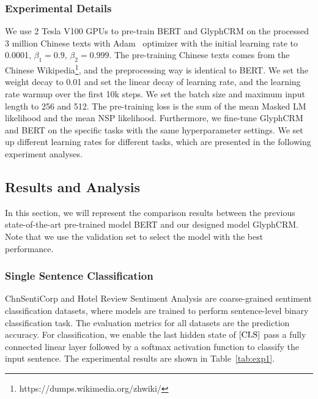 \subsubsection{Experimental Details} We use 2 Tesla V100 GPUs to pre-train BERT and GlyphCRM on the processed 3 million Chinese texts with Adam~\cite{kingma2014method} optimizer with the initial learning rate to 0.0001, $\beta_{1} = 0.9$, $\beta_{2} = 0.999$.
The pre-training Chinese texts comes from the Chinese Wikipedia\footnote{https://dumps.wikimedia.org/zhwiki/}, and the preprocessing way is identical to BERT.
We set the weight decay to 0.01 and set the linear decay of learning rate, and the learning rate warmup over the first 10k steps.
We set the batch size and maximum input length to 256 and 512. The pre-training loss is the sum of the mean Masked LM likelihood and the mean NSP likelihood. Furthermore, we fine-tune GlyphCRM and BERT on the specific tasks with the same hyperparameter settings.
We set up different learning rates for different tasks, which are presented in the following experiment analyses. 

\subsection{Results and Analysis}
In this section, we will represent the comparison results between the previous state-of-the-art pre-trained model BERT and our designed model GlyphCRM. Note that we use the validation set to select the model with the best performance.


\subsubsection{Single Sentence Classification} ChnSentiCorp and Hotel Review Sentiment Analysis are coarse-grained sentiment classification datasets, where models are trained to perform sentence-level binary classification task. The evaluation metrics for all datasets are the prediction accuracy. For classification, we enable the last hidden state of $\rm[CLS]$ pass a fully connected linear layer followed by a softmax activation function to classify the input sentence. The experimental results are shown in Table~\ref{tab:exp1}.


